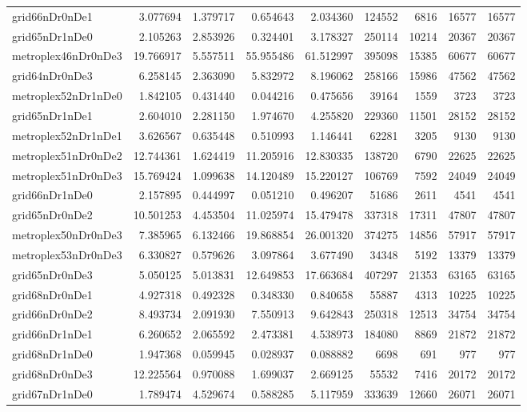 \begin{longtable}{|l|r|r|r|r|r|r|r|r|}
grid66nDr0nDe1 & 3.077694 & 1.379717 & 0.654643 & 2.034360 & 124552 & 6816 & 16577 & 16577 \\
grid65nDr1nDe0 & 2.105263 & 2.853926 & 0.324401 & 3.178327 & 250114 & 10214 & 20367 & 20367 \\
metroplex46nDr0nDe3 & 19.766917 & 5.557511 & 55.955486 & 61.512997 & 395098 & 15385 & 60677 & 60677 \\
grid64nDr0nDe3 & 6.258145 & 2.363090 & 5.832972 & 8.196062 & 258166 & 15986 & 47562 & 47562 \\
metroplex52nDr1nDe0 & 1.842105 & 0.431440 & 0.044216 & 0.475656 & 39164 & 1559 & 3723 & 3723 \\
grid65nDr1nDe1 & 2.604010 & 2.281150 & 1.974670 & 4.255820 & 229360 & 11501 & 28152 & 28152 \\
metroplex52nDr1nDe1 & 3.626567 & 0.635448 & 0.510993 & 1.146441 & 62281 & 3205 & 9130 & 9130 \\
metroplex51nDr0nDe2 & 12.744361 & 1.624419 & 11.205916 & 12.830335 & 138720 & 6790 & 22625 & 22625 \\
metroplex51nDr0nDe3 & 15.769424 & 1.099638 & 14.120489 & 15.220127 & 106769 & 7592 & 24049 & 24049 \\
grid66nDr1nDe0 & 2.157895 & 0.444997 & 0.051210 & 0.496207 & 51686 & 2611 & 4541 & 4541 \\
grid65nDr0nDe2 & 10.501253 & 4.453504 & 11.025974 & 15.479478 & 337318 & 17311 & 47807 & 47807 \\
metroplex50nDr0nDe3 & 7.385965 & 6.132466 & 19.868854 & 26.001320 & 374275 & 14856 & 57917 & 57917 \\
metroplex53nDr0nDe3 & 6.330827 & 0.579626 & 3.097864 & 3.677490 & 34348 & 5192 & 13379 & 13379 \\
grid65nDr0nDe3 & 5.050125 & 5.013831 & 12.649853 & 17.663684 & 407297 & 21353 & 63165 & 63165 \\
grid68nDr0nDe1 & 4.927318 & 0.492328 & 0.348330 & 0.840658 & 55887 & 4313 & 10225 & 10225 \\
grid66nDr0nDe2 & 8.493734 & 2.091930 & 7.550913 & 9.642843 & 250318 & 12513 & 34754 & 34754 \\
grid66nDr1nDe1 & 6.260652 & 2.065592 & 2.473381 & 4.538973 & 184080 & 8869 & 21872 & 21872 \\
grid68nDr1nDe0 & 1.947368 & 0.059945 & 0.028937 & 0.088882 & 6698 & 691 & 977 & 977 \\
grid68nDr0nDe3 & 12.225564 & 0.970088 & 1.699037 & 2.669125 & 55532 & 7416 & 20172 & 20172 \\
grid67nDr1nDe0 & 1.789474 & 4.529674 & 0.588285 & 5.117959 & 333639 & 12660 & 26071 & 26071 \\

\end{longtable}
